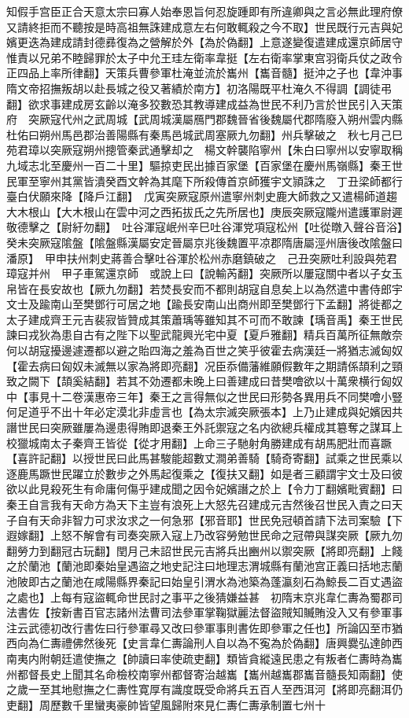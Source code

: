 知假手宫臣正合天意太宗曰寡人始奉恩旨何忍旋踵即有所違卿與之言必無此理府僚又請終拒而不聽按是時高祖無誅建成意左右何敢輒殺之今不取】世民既行元吉與妃嬪更迭為建成請封德彞復為之營解於外【為於偽翻】上意遂變復遣建成還京師居守惟責以兄弟不睦歸罪於太子中允王珪左衛率韋挺【左右衛率掌東宫羽衛兵仗之政令正四品上率所律翻】天策兵曹參軍杜淹並流於巂州【巂音髓】挺沖之子也【韋沖事隋文帝招撫叛胡以赴長城之役又著績於南方】初洛陽既平杜淹久不得調【調徒弔翻】欲求事建成房玄齡以淹多狡數恐其教導建成益為世民不利乃言於世民引入天策府　突厥寇代州之武周城【武周城漢屬鴈門郡魏晉省後魏屬代郡隋廢入朔州雲内縣杜佑曰朔州馬邑郡治善陽縣有秦馬邑城武周塞厥九勿翻】州兵擊破之　秋七月己巳苑君璋以突厥寇朔州摠管秦武通擊却之　楊文幹襲陷寧州【朱白曰寧州以安寧取稱九域志北至慶州一百二十里】驅掠吏民出據百家堡【百家堡在慶州馬嶺縣】秦王世民軍至寧州其黨皆潰癸酉文幹為其麾下所殺傳首京師獲宇文頴誅之　丁丑梁師都行臺白伏願來降【降戶江翻】　戊寅突厥寇原州遣寧州刺史鹿大師救之又遣楊師道趨大木根山【大木根山在雲中河之西拓拔氏之先所居也】庚辰突厥寇隴州遣護軍尉遲敬德擊之【尉紆勿翻】　吐谷渾寇岷州辛巳吐谷渾党項寇松州【吐從暾入聲谷音浴】　癸未突厥寇隂盤【隂盤縣漢屬安定晉屬京兆後魏置平凉郡隋唐屬涇州唐後改隂盤曰潘原】　甲申扶州刺史蔣善合擊吐谷渾於松州赤磨鎮破之　己丑突厥吐利設與苑君璋寇并州　甲子車駕還京師　或說上曰【說輸芮翻】突厥所以屢寇關中者以子女玉帛皆在長安故也【厥九勿翻】若焚長安而不都則胡寇自息矣上以為然遣中書侍郎宇文士及踰南山至樊鄧行可居之地【踰長安南山出商州即至樊鄧行下孟翻】將徙都之太子建成齊王元吉裴寂皆贊成其策蕭瑀等雖知其不可而不敢諫【瑀音禹】秦王世民諫曰戎狄為患自古有之陛下以聖武龍興光宅中夏【夏戶雅翻】精兵百萬所征無敵奈何以胡寇擾邊遽遷都以避之貽四海之羞為百世之笑乎彼霍去病漢廷一將猶志滅匈奴【霍去病曰匈奴未滅無以家為將即亮翻】况臣忝備藩維願假數年之期請係頡利之頸致之闕下【頡奚結翻】若其不効遷都未晚上曰善建成曰昔樊噲欲以十萬衆横行匈奴中【事見十二卷漢惠帝三年】秦王之言得無似之世民曰形勢各異用兵不同樊噲小豎何足道乎不出十年必定漠北非虛言也【為太宗滅突厥張本】上乃止建成與妃嬪因共譖世民曰突厥雖屢為邊患得賄即退秦王外託禦寇之名内欲總兵權成其簒奪之謀耳上校獵城南太子秦齊王皆從【從才用翻】上命三子馳射角勝建成有胡馬肥壯而喜蹶【喜許記翻】以授世民曰此馬甚駿能超數丈澗弟善騎【騎奇寄翻】試乘之世民乘以逐鹿馬蹶世民躍立於數步之外馬起復乘之【復扶又翻】如是者三顧謂宇文士及曰彼欲以此見殺死生有命庸何傷乎建成聞之因令妃嬪譖之於上【令力丁翻嬪毗賓翻】曰秦王自言我有天命方為天下主豈有浪死上大怒先召建成元吉然後召世民入責之曰天子自有天命非智力可求汝求之一何急邪【邪音耶】世民免冠頓首請下法司案驗【下遐嫁翻】上怒不解會有司奏突厥入寇上乃改容勞勉世民命之冠帶與謀突厥【厥九勿翻勞力到翻冠古玩翻】閏月己未詔世民元吉將兵出豳州以禦突厥【將即亮翻】上餞之於蘭池【蘭池即秦始皇遇盜之地史記注曰地理志渭城縣有蘭池宫正義曰括地志蘭池陂即古之蘭池在咸陽縣界秦記曰始皇引渭水為池築為蓬瀛刻石為鯨長二百丈遇盜之處也】上每有寇盜輒命世民討之事平之後猜嫌益甚　初隋末京兆韋仁夀為蜀郡司法書佐【按新書百官志諸州法曹司法參軍掌鞠獄麗法督盜賊知贓賄没入又有參軍事注云武德初改行書佐曰行參軍尋又改曰參軍事則書佐即參軍之任也】所論囚至市猶西向為仁夀禮佛然後死【史言韋仁夀論刑人自以為不寃為於偽翻】唐興爨弘達帥西南夷内附朝廷遣使撫之【帥讀曰率使疏吏翻】類皆貪縱遠民患之有叛者仁夀時為巂州都督長史上聞其名命檢校南寧州都督寄治越巂【巂州越巂郡巂音髓長知兩翻】使之歲一至其地慰撫之仁夀性寛厚有識度既受命將兵五百人至西洱河【將即亮翻洱仍吏翻】周歷數千里蠻夷豪帥皆望風歸附來見仁夀仁夀承制置七州十